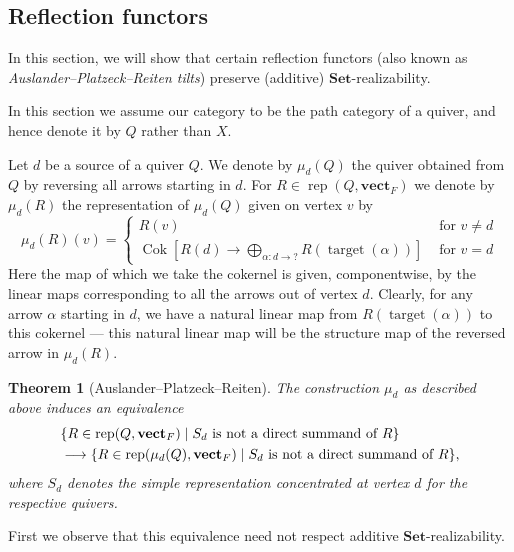 \documentclass[a4paper]{amsart}
\theoremstyle{plain}
\newtheorem{theorem}{Theorem}[section]
\theoremstyle{definition}
\theoremstyle{remark}
\newcommand{\Set}{\mathbf{Set}}
\newcommand{\vectF}{\mathbf{vect}_F}
\DeclareMathOperator{\rep}{rep}
\begin{document}
\subsection{Reflection functors}
\label{sect.APR}
In this section, we will show that certain reflection functors (also known as \emph{Auslander--Platzeck--Reiten tilts}) preserve (additive) \( \Set \)-realizability.

In this section we assume our category to be the path category of a quiver, and hence denote it by \( Q \) rather than \( X \). 

Let \( d \) be a source of a quiver \( Q \). We denote by \( \mu_d( Q) \) the quiver obtained from \( Q \) by reversing all arrows starting in \( d \). For \( R \in \rep( Q, \vectF ) \) we denote by \( \mu_d(R) \) the representation of \( \mu_d(Q) \) given on vertex \( v \) by
\[ \mu_d(R)(v) = \begin{cases} R(v) & \text{ for } v \neq d \\ \operatorname{Cok}[ R(d) \to \bigoplus_{\alpha \colon d \to ?} R({\operatorname{target}}(\alpha))] & \text{ for } v = d \end{cases} \]
Here the map of which we take the cokernel is given, componentwise, by the linear maps corresponding to all the arrows out of vertex \( d \). Clearly, for any arrow \( \alpha \) starting in \( d \), we have a natural linear map from \( R(\operatorname{target}(\alpha)) \) to this cokernel --- this natural linear map will be the structure map of the reversed arrow in \( \mu_d(R) \).
\begin{theorem}[Auslander--Platzeck--Reiten]
\label{thm.APR}
The construction \( \mu_d \) as described above induces an equivalence
\begin{align*}
& \{ R \in \rep( Q, \vectF) \mid S_d \text{ is not a direct summand of \( R \)} \}  \\
& \longrightarrow \{ R \in \rep( \mu_d(Q), \vectF) \mid S_d \text{ is not a direct summand of \( R \)} \},
\end{align*}
where \( S_d \) denotes the simple representation concentrated at vertex \( d \) for the respective quivers.
\end{theorem}
First we observe that this equivalence need not respect additive \( \Set \)-realizability. 
\end{document}
